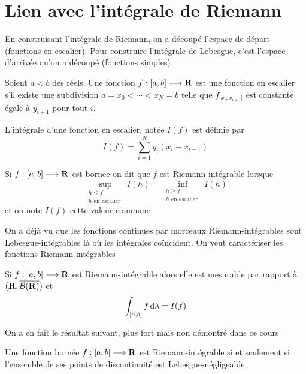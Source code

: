 \section{Lien avec l'intégrale de Riemann}


\begin{rem}
    En construisant l'intégrale de Riemann, on a découpé l'espace de départ (fonctions en escalier). Pour construire l'intégrale de Lebesgue, c'est l'espace d'arrivée qu'on a découpé (fonctions simples)
\end{rem}

\begin{dfn}
    Soient $a<b$ des réels. Une fonction $f:[a,b] \longrightarrow  \mathbf R$ est une fonction en escalier s'il existe une subdivision $a=x_0<\cdots <x_N=b$ telle que $f_{]x_i, x_{i+1}[}$ est constante égale à $y_{i+1}$ pour tout $i$. 
\end{dfn}

\begin{dfn}
    L'intégrale d'une fonction en escalier, notée $I(f)$ est définie par \[
        I(f)=\sum_{i=1}^N y_i(x_{i}-x_{i-1})
    \] 
\end{dfn}

\begin{dfn}
    Si $f:[a, b] \longrightarrow  \mathbf R$ est bornée on dit que $f$ est Riemann-intégrable lorsque  \[
        \sup_{\substack{h\leq f\\h\text{ en escalier }}} I(h)=\inf_{\substack{h\geq f\\h\text{ en escalier }}} I(h)
    \]
    et on note $I(f)$ cette valeur commune
\end{dfn}

\begin{rem}
On a déjà vu que les fonctions continues par morceaux Riemann-intégrables sont Lebesgue-intégrables là où les intégrales coïncident. On veut caractériser les fonctions Riemann-intégrables
\end{rem}

\begin{prop}
    Si $f:[a, b]\longrightarrow \mathbf R$ est Riemann-intégrable alors elle est mesurable par rapport à $(\mathbf R, \overline{\mathcal B(\mathbf R)})$ et \[
        \int_{[a,b]}f\mathop{}\!\mathrm d \lambda=I(f)
    \] 
\end{prop}

On a en fait le résultat suivant, plus fort mais non démontré dans ce cours

\begin{thm}
    Une fonction bornée $f:[a,b] \longrightarrow \mathbf R$ est Riemann-intégrable si et seulement si l'ensemble de ses points de discontinuité est Lebesgue-négligeable.
\end{thm}

